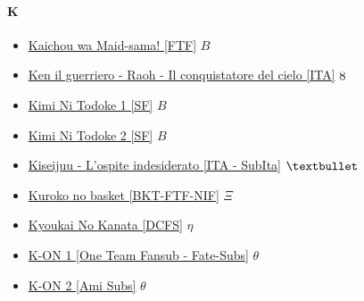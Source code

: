 		\paragraph{K} \hypertarget{SK}{}
			\begin{itemize}
				
				\item \href{https://mega.nz/#F!5I1QGRaQ!kEgYRoEw_W0VQPPqzI01kQ} {Kaichou wa Maid-sama! [FTF]}  $B$ \\
				\item \href{https://mega.nz/#F!K6Q2AQiZ!VVO-bLkCaL0IOKKyyCdMVQ} {Ken il guerriero - Raoh - Il conquistatore del cielo [ITA]}  $\oldstylenums{8}$ \\ 
				\item \href{https://mega.nz/#F!YUkFhaia!pRH-oGWMX7CVH4wVxR___g} {Kimi Ni Todoke 1 [SF]}  $B$ \\ 
				\item \href{https://mega.nz/#F!dd8ASLLJ!tNV-3DCc0bc1ube0cyGN1g} {Kimi Ni Todoke 2 [SF]}  $B$ \\ 
				\item \href{https://mega.nz/#F!XOpmFA6B!oLk_7fwo93HzgWHfYrPJ9Q} {Kiseijuu - L'ospite indesiderato [ITA - SubIta]}  $\textbullet$ \\
				\item \href{https://mega.nz/#F!dXoxXa5C!wJXlM2zNAccwyOjrryGz5Q} {Kuroko no basket [BKT-FTF-NIF]}  $\varXi$ \\  
				\item \href{https://mega.nz/#F!cY8D3ZhI!BdNrTsbz3dQvJYAa3FxtkQ} {Kyoukai No Kanata [DCFS]}  $\eta$ \\ 
				\item \href{https://mega.nz/#F!Yhd2Fb4D!9Dx6kRXSoZh34FdHiGw0uA} {K-ON 1 [One Team Fansub - Fate-Subs]}  $\theta$ \\ 
				\item \href{https://mega.nz/#F!10NTRLyB!nmxuhNiwF4y2SMbTXcGBKw} {K-ON 2 [Ami Subs]}  $\theta$ \\ 
			\end{itemize}	
			
